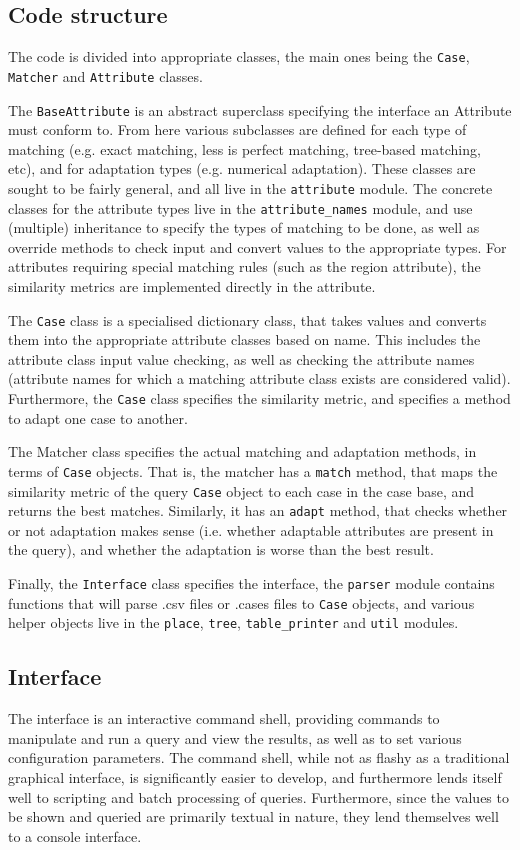 \documentclass[11pt]{article}
\begin{document}
\subsection{Code structure}
The code is divided into appropriate classes, the main ones being the
\texttt{Case}, \texttt{Matcher} and \texttt{Attribute} classes.

The \texttt{BaseAttribute} is an abstract superclass specifying the interface
an Attribute must conform to. From here various subclasses are defined
for each type of matching (e.g. exact matching, less is perfect
matching, tree-based matching, etc), and for adaptation types (e.g.
numerical adaptation). These classes are sought to be fairly general,
and all live in the \texttt{attribute} module. The concrete classes for the
attribute types live in the \texttt{attribute\_names} module, and use
(multiple) inheritance to specify the types of matching to be done, as
well as override methods to check input and convert values to the
appropriate types. For attributes requiring special matching rules
(such as the region attribute), the similarity metrics are implemented
directly in the attribute.

The \texttt{Case} class is a specialised dictionary class, that takes
values and converts them into the appropriate attribute classes based
on name. This includes the attribute class input value checking, as
well as checking the attribute names (attribute names for which a
matching attribute class exists are considered valid). Furthermore,
the \texttt{Case} class specifies the similarity metric, and specifies
a method to adapt one case to another.

The Matcher class specifies the actual matching and adaptation
methods, in terms of \texttt{Case} objects. That is, the matcher has a
\texttt{match} method, that maps the similarity metric of the query
\texttt{Case} object to each case in the case base, and returns the
best matches. Similarly, it has an \texttt{adapt} method, that checks
whether or not adaptation makes sense (i.e. whether adaptable
attributes are present in the query), and whether the adaptation is
worse than the best result.

Finally, the \texttt{Interface} class specifies the interface, the
\texttt{parser} module contains functions that will parse .csv files
or .cases files to \texttt{Case} objects, and various helper objects
live in the \texttt{place}, \texttt{tree}, \texttt{table\_printer} and
\texttt{util} modules.

\subsection{Interface}
The interface is an interactive command shell, providing commands to
manipulate and run a query and view the results, as well as to set
various configuration parameters. The command shell, while not as
flashy as a traditional graphical interface, is significantly easier
to develop, and furthermore lends itself well to scripting and batch
processing of queries. Furthermore, since the values to be shown and
queried are primarily textual in nature, they lend themselves well to
a console interface.
\end{document}
